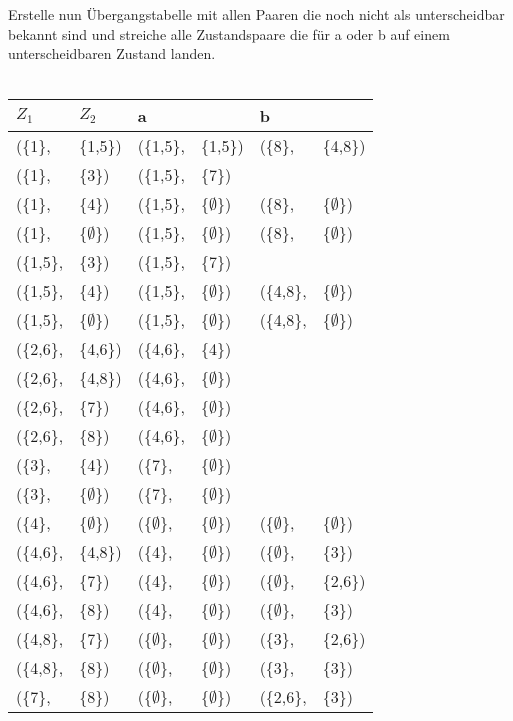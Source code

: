 \documentclass[11pt]{article}
\begin{document}
Erstelle nun Übergangstabelle mit allen Paaren die noch nicht als unterscheidbar bekannt sind und streiche alle Zustandspaare die für a oder b auf einem unterscheidbaren Zustand landen.
\\ \ \\
\begin{tabular}{ll|ll|ll}
$Z_{1}$&$Z_{2}$&a&&b&\\
\hline
(\{1\}, & \{1,5\}) & (\{1,5\}, & \{1,5\}) & (\{8\}, & \{4,8\})\\
{(\{1\},} & \{3\}) & (\{1,5\}, & \{7\}) & \\
(\{1\}, & \{4\})   & (\{1,5\}, & \{$\emptyset$\}) & (\{8\}, & \{$\emptyset$\})\\
(\{1\}, & \{$\emptyset$\}) & (\{1,5\}, & \{$\emptyset$\}) & (\{8\}, & \{$\emptyset$\})\\
(\{1,5\}, & \{3\}) & (\{1,5\}, & \{7\}) & \\
(\{1,5\}, & \{4\}) & (\{1,5\}, & \{$\emptyset$\}) & (\{4,8\}, & \{$\emptyset$\})\\
(\{1,5\}, & \{$\emptyset$\}) & (\{1,5\}, & \{$\emptyset$\}) & (\{4,8\}, & \{$\emptyset$\})\\
(\{2,6\}, & \{4,6\}) & (\{4,6\}, & \{4\}) & \\
(\{2,6\}, & \{4,8\}) & (\{4,6\}, & \{$\emptyset$\}) & \\
(\{2,6\}, & \{7\}) & (\{4,6\}, & \{$\emptyset$\}) & \\
(\{2,6\}, & \{8\}) & (\{4,6\}, & \{$\emptyset$\}) & \\
(\{3\}, & \{4\}) & (\{7\}, & \{$\emptyset$\}) & \\
(\{3\}, & \{$\emptyset$\}) & (\{7\}, & \{$\emptyset$\}) & \\
(\{4\}, & \{$\emptyset$\}) & (\{$\emptyset$\}, & \{$\emptyset$\}) & (\{$\emptyset$\}, & \{$\emptyset$\})\\
(\{4,6\}, & \{4,8\}) & (\{4\}, & \{$\emptyset$\}) & (\{$\emptyset$\}, & \{3\})\\
(\{4,6\}, & \{7\}) & (\{4\}, & \{$\emptyset$\}) & (\{$\emptyset$\}, & \{2,6\})\\
(\{4,6\}, & \{8\}) & (\{4\}, & \{$\emptyset$\}) & (\{$\emptyset$\}, & \{3\})\\
(\{4,8\}, & \{7\}) & (\{$\emptyset$\}, & \{$\emptyset$\}) & (\{3\}, & \{2,6\})\\
(\{4,8\}, & \{8\}) & (\{$\emptyset$\}, & \{$\emptyset$\}) & (\{3\}, & \{3\})\\
(\{7\}, & \{8\}) & (\{$\emptyset$\}, & \{$\emptyset$\}) & (\{2,6\}, & \{3\})\\
\end{tabular}
\end{document}
